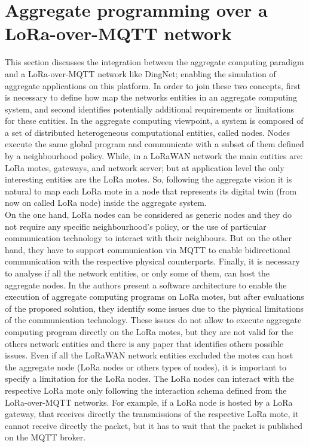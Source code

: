 \section{Aggregate programming over a LoRa-over-MQTT network}
\label{sec:contributionACOverDingNet}
This section discusses the integration between the aggregate computing paradigm and a LoRa-over-MQTT network like DingNet; enabling the simulation of aggregate applications on this platform.
In order to join these two concepts, first is necessary to define how map the networks entities in an aggregate computing system, and second identifies potentially additional requirements or limitations for these entities.
In the aggregate computing viewpoint, a system is composed of a set of distributed heterogeneous computational entities, called nodes. Nodes execute the same global program and communicate with a subset of them defined by a neighbourhood policy. 
While, in a LoRaWAN network the main entities are: LoRa motes, gateways, and network server; but at application level the only interesting entities are the LoRa motes.
So, following the aggregate vision it is natural to map each LoRa mote in a node that represents its digital twin (from now on called LoRa node) inside the aggregate system.
\\On the one hand, LoRa nodes can be considered as generic nodes and they do not require any specific neighbourhood's policy, or the use of particular communication technology to interact with their neighbours. 
But on the other hand, they have to support communication via MQTT to enable bidirectional communication with the respective physical counterparts.
Finally, it is necessary to analyse if all the network entities, or only some of them, can host the aggregate nodes.
In \cite{CCNCPS2018} the authors present a software architecture to enable the execution of aggregate computing programs on LoRa motes, but after evaluations of the proposed solution, they identify some issues due to the physical limitations of the communication technology. 
These issues do not allow to execute aggregate computing program directly on the LoRa motes, but they are not valid for the others network entities and there is any paper that identifies others possible issues.
Even if all the LoRaWAN network entities excluded the motes can host the aggregate node (LoRa nodes or others types of nodes), it is important to specify a limitation for the LoRa nodes. 
The LoRa nodes can interact with the respective LoRa mote only following the interaction schema defined from the LoRa-over-MQTT networks. 
For example, if a LoRa node is hosted by a LoRa gateway, that receives directly the transmissions of the respective LoRa mote, it cannot receive directly the packet, but it has to wait that the packet is published on the MQTT broker.

